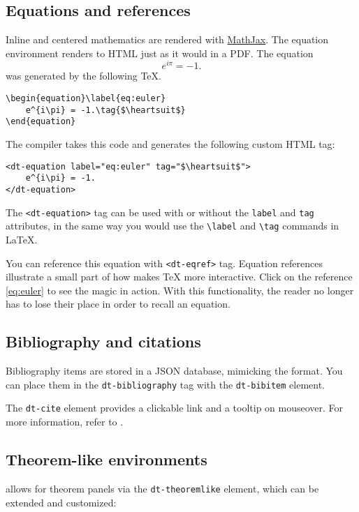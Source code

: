 \documentclass[11pt]{article}
\begin{document}
\subsection{Equations and references}
Inline and centered mathematics are rendered with \href{https://www.mathjax.org}{MathJax}.
The equation environment renders to HTML just as it would in a PDF.
The equation
\begin{equation}\label{eq:euler}
    e^{i\pi} = -1.\tag{\heartsuit}
\end{equation}
was generated by the following \TeX{}.
\begin{verbatim}
\begin{equation}\label{eq:euler}
    e^{i\pi} = -1.\tag{$\heartsuit$}
\end{equation}
\end{verbatim}
The \DiscoTeX{} compiler takes this code and generates the following custom HTML tag:
\begin{verbatim}
<dt-equation label="eq:euler" tag="$\heartsuit$">
    e^{i\pi} = -1.
</dt-equation>
\end{verbatim}
The \verb|<dt-equation>| tag can be used with or without the \verb|label| and \verb|tag| attributes, in the same way you would use the \verb|\label| and \verb|\tag| commands in \LaTeX{}.

You can reference this equation with \verb|<dt-eqref>| tag.
Equation references illustrate a small part of how \DiscoTeX{} makes \TeX{} more interactive.
Click on the reference \eqref{eq:euler} to see the magic in action.
With this functionality, the reader no longer has to lose their place in order to recall an equation.

\subsection{Bibliography and citations}
Bibliography items are stored in a JSON database, mimicking the \BibTeX{} format.
You can place them in the \verb|dt-bibliography| tag with the \verb|dt-bibitem| element.

The \verb|dt-cite| element provides a clickable link and a tooltip on mouseover. For more information, refer to \cite{wiki-reftooltip}.

\subsection{Theorem-like environments}
\DiscoTeX{} allows for theorem panels via the \verb|dt-theoremlike| element, which can be extended and customized:
\end{document}
